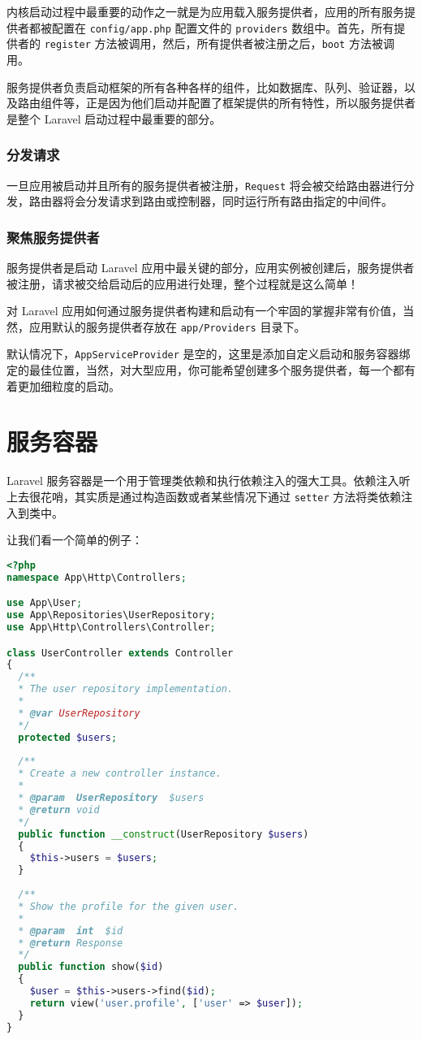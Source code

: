 \documentclass{progartcn}
\begin{document}
内核启动过程中最重要的动作之一就是为应用载入服务提供者，应用的所有服务提供者都被配置在 \verb|config/app.php| 配置文件的 \verb|providers| 数组中。首先，所有提供者的 \verb|register| 方法被调用，然后，所有提供者被注册之后，\verb|boot| 方法被调用。

服务提供者负责启动框架的所有各种各样的组件，比如数据库、队列、验证器，以及路由组件等，正是因为他们启动并配置了框架提供的所有特性，所以服务提供者是整个 Laravel 启动过程中最重要的部分。

\subsubsection{分发请求}

一旦应用被启动并且所有的服务提供者被注册，\verb|Request| 将会被交给路由器进行分发，路由器将会分发请求到路由或控制器，同时运行所有路由指定的中间件。

\subsubsection{聚焦服务提供者}

服务提供者是启动 Laravel 应用中最关键的部分，应用实例被创建后，服务提供者被注册，请求被交给启动后的应用进行处理，整个过程就是这么简单！

对 Laravel 应用如何通过服务提供者构建和启动有一个牢固的掌握非常有价值，当然，应用默认的服务提供者存放在 \verb|app/Providers| 目录下。

默认情况下，\verb|AppServiceProvider| 是空的，这里是添加自定义启动和服务容器绑定的最佳位置，当然，对大型应用，你可能希望创建多个服务提供者，每一个都有着更加细粒度的启动。

\section{服务容器}

Laravel 服务容器是一个用于管理类依赖和执行依赖注入的强大工具。依赖注入听上去很花哨，其实质是通过构造函数或者某些情况下通过 \verb|setter| 方法将类依赖注入到类中。

让我们看一个简单的例子：

\begin{lstlisting}[language=PHP]
<?php
namespace App\Http\Controllers;

use App\User;
use App\Repositories\UserRepository;
use App\Http\Controllers\Controller;

class UserController extends Controller
{
  /**
  * The user repository implementation.
  *
  * @var UserRepository
  */
  protected $users;
  
  /**
  * Create a new controller instance.
  * 
  * @param  UserRepository  $users
  * @return void
  */
  public function __construct(UserRepository $users)
  {
    $this->users = $users;
  }
  
  /**
  * Show the profile for the given user.
  *
  * @param  int  $id
  * @return Response
  */
  public function show($id)
  {
    $user = $this->users->find($id);
    return view('user.profile', ['user' => $user]);
  }
}
\end{lstlisting}
\end{document}
